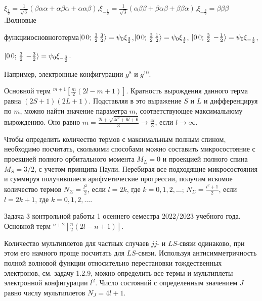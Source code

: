 \vspace{-\parskip+0.8mm}
$\xi_{\frac12}=\frac{1}{\sqrt3} (\beta \alpha \alpha + \alpha \beta \alpha + \alpha \alpha \beta )$,\hspace{\fill}$\xi_{-\frac12}=\frac{1}{\sqrt3} (\alpha \beta \beta + \beta \alpha \beta + \beta \beta \alpha )$,\hspace{\fill}$\xi_{-\frac32}=\beta \beta \beta$.\hspace{\fill}Волновые \par
\vspace{-\parskip+1.2mm}
функции\hspace{\fill}основного\hspace{\fill}терма\hspace{\fill}$\ket{0\,0;\,\frac32\,\frac32}=\psi_0 \xi_{\frac32}$,\hspace{\fill}$\ket{0\,0;\,\frac32\,\frac12}=\psi_0 \xi_{\frac12}$, $\ket{0\,0;\,\frac32\,-\!\frac12}=\psi_0 \xi_{-\frac12}$, \par
\vspace{-\parskip+1mm}
$\ket{0\,0;\,\frac32\,-\!\frac32}=\psi_0 \xi_{-\frac32}$.\par
{} Например, электронные конфигурации $g^8$ и $g^{10}$.\par
{} Основной терм $^{m+1}\left[\frac m2 (2l-m+1)\right]$. Кратность вырождения данного терма равна $(2S+1)(2L+1)$. Подставляя в это выражение $S$ и $L$ и дифференцируя по $m$, можно найти значение параметра $m$, соответствующее максимальному вырождению. Оно равно $m=\frac{2l+\sqrt{4l^2 +6l+6}}{3} \rightarrow \frac{4l}{3}$, если $l \rightarrow \infty$.\par
{} Чтобы определить количество термов с максимальным полным спином, необходимо посчитать, сколькими способами можно составить микросостояние с проекцией полного орбитального момента $M_L=0$ и проекцией полного спина $M_S=3/2$, с учетом принципа Паули. Перебирая все подходящие микросостояния и суммируя получившиеся арифметические прогрессии, получим искомое количество термов $N_{\Sigma}=\frac{l^2}{2}$, если $l=2k$, где $k=0\text{,}\,1\text{,}\,2\text{,}\,\ldots$; $N_{\Sigma}=\frac{l^2+1}{2}$, если $l=2k+1$, где $k=0\text{,}\,1\text{,}\,2\text{,}\,\ldots$.\par
{} Задача 3 контрольной работы 1 осеннего семестра 2022/2023 учебного года. Основной терм $^{n+2 }\left[\frac n2 (2l-n+1)\right]$.\par
{} Количество мультиплетов для частных случаев $jj$- и $LS$-связи одинаково, при этом его намного проще посчитать для $LS$-связи. Используя антисимметричность полной волновой функции относительно перестановки тождественных электронов, см. задачу 1.2.9, можно определить все термы и мультиплеты электронной конфигурации $l^2$. Число состояний с определенным значением $J$ равно числу мультиплетов $N_J=4l+1$.\par
